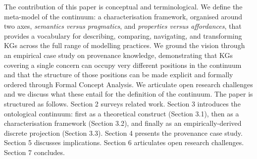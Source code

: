 \documentclass[runningheads]{llncs}
\newcommand{\add}[1]{\textcolor{addedcolor}{#1}}
\begin{document}
\add{The contribution of this paper is conceptual and terminological. We define the meta-model of the continuum: a characterisation framework, organised around two axes, \emph{semantics versus pragmatics}, and \emph{properties versus affordances}, that provides a vocabulary for describing, comparing, navigating, and transforming KGs across the full range of modelling practices. We ground the vision through an empirical case study on provenance knowledge, demonstrating that KGs covering a single concern can occupy very different positions in the continuum and that the structure of those positions can be made explicit and formally ordered through Formal Concept Analysis. We articulate open research challenges and we discuss what these entail for the definition of the continuum.}
\add{The paper is structured as follows. Section 2 surveys related work. Section 3 introduces the ontological continuum: first as a theoretical construct (Section 3.1), then as a characterisation framework (Section 3.2), and finally as an empirically-derived discrete projection (Section 3.3). Section 4 presents the provenance case study. Section 5 discusses implications. Section 6 articulates open research challenges. Section 7 concludes.}
\end{document}
